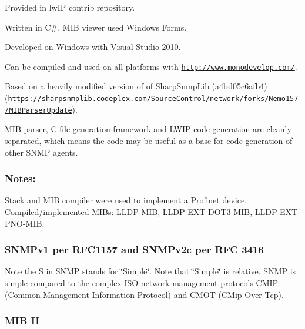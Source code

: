 \begin{DoxyItemize}
\item Provided in lw\+IP contrib repository.
\item Written in C\#. M\+IB viewer used Windows Forms.
\item Developed on Windows with Visual Studio 2010.
\item Can be compiled and used on all platforms with \href{http://www.monodevelop.com/}{\tt http\+://www.\+monodevelop.\+com/}.
\item Based on a heavily modified version of of Sharp\+Snmp\+Lib (a4bd05c6afb4) (\href{https://sharpsnmplib.codeplex.com/SourceControl/network/forks/Nemo157/MIBParserUpdate}{\tt https\+://sharpsnmplib.\+codeplex.\+com/\+Source\+Control/network/forks/\+Nemo157/\+M\+I\+B\+Parser\+Update}).
\item M\+IB parser, C file generation framework and L\+W\+IP code generation are cleanly separated, which means the code may be useful as a base for code generation of other S\+N\+MP agents.
\end{DoxyItemize}

\subsubsection*{Notes\+: }


\begin{DoxyItemize}
\item Stack and M\+IB compiler were used to implement a Profinet device. Compiled/implemented M\+I\+Bs\+: L\+L\+D\+P-\/\+M\+IB, L\+L\+D\+P-\/\+E\+X\+T-\/\+D\+O\+T3-\/\+M\+IB, L\+L\+D\+P-\/\+E\+X\+T-\/\+P\+N\+O-\/\+M\+IB.
\end{DoxyItemize}

\subsubsection*{S\+N\+M\+Pv1 per R\+F\+C1157 and S\+N\+M\+Pv2c per R\+FC 3416 }

Note the S in S\+N\+MP stands for \char`\"{}\+Simple\char`\"{}. Note that \char`\"{}\+Simple\char`\"{} is relative. S\+N\+MP is simple compared to the complex I\+SO network management protocols C\+M\+IP (Common Management Information Protocol) and C\+M\+OT (C\+Mip Over Tcp).

\subsubsection*{M\+IB II }

